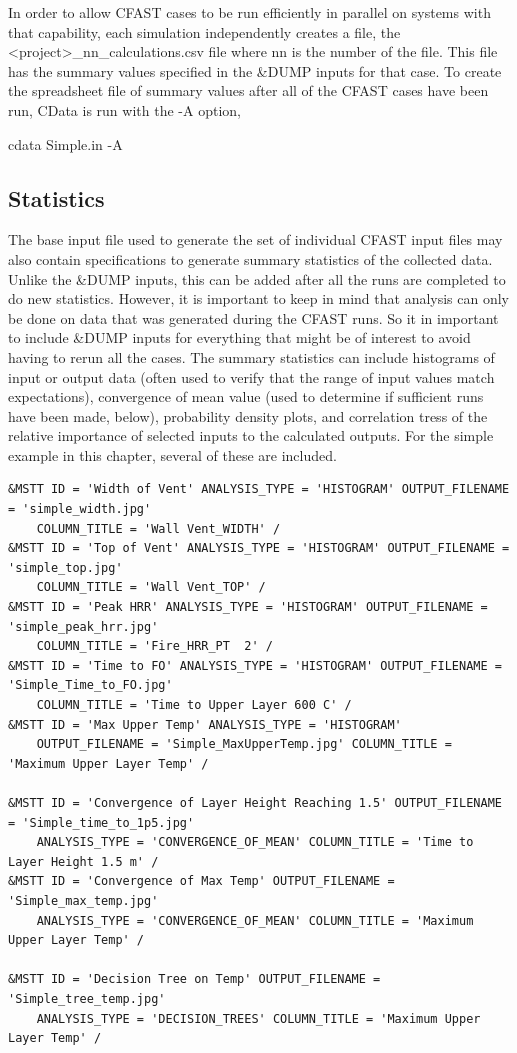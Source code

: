 \documentclass[12pt,twoside]{book}
\begin{document}
In order to allow CFAST cases to be run efficiently in parallel on systems with that capability, each simulation independently creates a file, the {\ct <project>\_nn\_calculations.csv} file where {\ct nn} is the number of the file. This file has the summary values specified in the {\ct \&DUMP} inputs for that case. To create the spreadsheet file of summary values after all of the CFAST cases have been run, CData is run with the {\ct -A} option,

\vspace{\baselineskip}
{\ct cdata Simple.in -A}

\subsection{Statistics}

The base input file used to generate the set of individual CFAST input files may also contain specifications to generate summary statistics of the collected data. Unlike the {\ct \&DUMP} inputs, this can be added after all the runs are completed to do new statistics. However, it is important to keep in mind that analysis can only be done on data that was generated during the CFAST runs. So it in important to include {\ct \&DUMP} inputs for everything that might be of interest to avoid having to rerun all the cases. The summary statistics can include histograms of input or output data (often used to verify that the range of input values match expectations), convergence of mean value (used to determine if sufficient runs have been made, below), probability density plots, and correlation tress of the relative importance of selected inputs to the calculated outputs. For the simple example in this chapter, several of these are included.

\begin{lstlisting}[basicstyle=\scriptsize]
&MSTT ID = 'Width of Vent' ANALYSIS_TYPE = 'HISTOGRAM' OUTPUT_FILENAME = 'simple_width.jpg'
	COLUMN_TITLE = 'Wall Vent_WIDTH' /
&MSTT ID = 'Top of Vent' ANALYSIS_TYPE = 'HISTOGRAM' OUTPUT_FILENAME = 'simple_top.jpg'
	COLUMN_TITLE = 'Wall Vent_TOP' /
&MSTT ID = 'Peak HRR' ANALYSIS_TYPE = 'HISTOGRAM' OUTPUT_FILENAME = 'simple_peak_hrr.jpg'
	COLUMN_TITLE = 'Fire_HRR_PT  2' /
&MSTT ID = 'Time to FO' ANALYSIS_TYPE = 'HISTOGRAM' OUTPUT_FILENAME = 'Simple_Time_to_FO.jpg'
	COLUMN_TITLE = 'Time to Upper Layer 600 C' /
&MSTT ID = 'Max Upper Temp' ANALYSIS_TYPE = 'HISTOGRAM'
	OUTPUT_FILENAME = 'Simple_MaxUpperTemp.jpg' COLUMN_TITLE = 'Maximum Upper Layer Temp' /

&MSTT ID = 'Convergence of Layer Height Reaching 1.5' OUTPUT_FILENAME = 'Simple_time_to_1p5.jpg'
	ANALYSIS_TYPE = 'CONVERGENCE_OF_MEAN' COLUMN_TITLE = 'Time to Layer Height 1.5 m' /
&MSTT ID = 'Convergence of Max Temp' OUTPUT_FILENAME = 'Simple_max_temp.jpg'
	ANALYSIS_TYPE = 'CONVERGENCE_OF_MEAN' COLUMN_TITLE = 'Maximum Upper Layer Temp' /

&MSTT ID = 'Decision Tree on Temp' OUTPUT_FILENAME = 'Simple_tree_temp.jpg'
	ANALYSIS_TYPE = 'DECISION_TREES' COLUMN_TITLE = 'Maximum Upper Layer Temp' /
\end{lstlisting}
\end{document}
